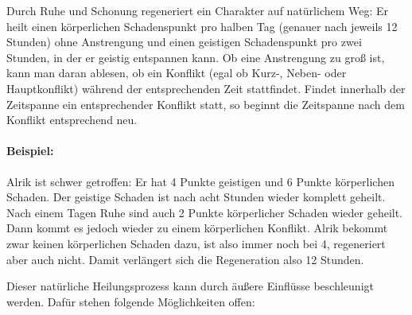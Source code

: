 Durch Ruhe und Schonung regeneriert ein Charakter auf natürlichem Weg: Er heilt einen körperlichen Schadenspunkt pro halben Tag (genauer nach jeweils 12 Stunden) ohne Anstrengung und einen geistigen Schadenspunkt pro zwei Stunden, in der er geistig entspannen kann. Ob eine Anstrengung zu groß ist, kann man daran ablesen, ob ein Konflikt (egal ob Kurz-, Neben- oder Hauptkonflikt) während der entsprechenden Zeit stattfindet. Findet innerhalb der Zeitspanne ein entsprechender Konflikt statt, so beginnt die Zeitspanne nach dem Konflikt entsprechend neu.

\begin{beispiel}
\paragraph{Beispiel:} Alrik ist schwer getroffen: Er hat 4 Punkte geistigen und 6 Punkte körperlichen Schaden. Der geistige Schaden ist nach acht Stunden wieder komplett geheilt. Nach einem Tagen Ruhe sind auch 2 Punkte körperlicher Schaden wieder geheilt. Dann kommt es jedoch wieder zu einem körperlichen Konflikt. Alrik bekommt zwar keinen körperlichen Schaden dazu, ist also immer noch bei 4, regeneriert aber auch nicht. Damit verlängert sich die Regeneration also 12 Stunden.
\end{beispiel}


Dieser natürliche Heilungsprozess kann durch äußere Einflüsse beschleunigt werden. Dafür stehen folgende Möglichkeiten offen:

